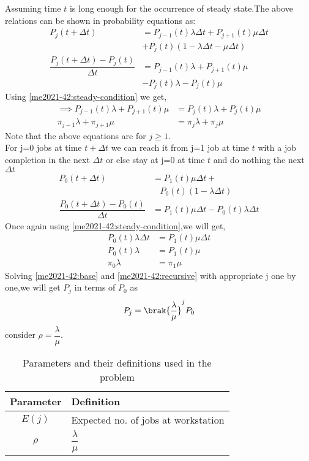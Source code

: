  Assuming time  $t$ is long enough for the occurrence of steady state.The above relations can be shown in probability equations as:  
 \begin{align}
     P_j(t+\Delta t)&=P_{j-1}(t)\lambda\Delta t+ P_{j+1}(t)\mu \Delta t \nonumber\\&+P_j (t) (1-\lambda\Delta t -\mu \Delta t)\\
     \dfrac{P_j(t+\Delta t)-P_j (t)}{\Delta t}&= P_{j-1}(t)\lambda +P_{j+1}(t)\mu\nonumber\\& - P_j(t)\lambda -P_j(t)\mu
\end{align}
Using \eqref{me2021-42:steady-condition} we get,
\begin{align}
     \implies P_{j-1}(t)\lambda +P_{j+1}(t)\mu&=P_j(t)\lambda +P_j(t)\mu \\
     \pi_{j-1}\lambda +\pi_{j+1}\mu&=\pi_j\lambda +\pi_j\mu\label{me2021-42:recursive} 
 \end{align}
 Note that the above equations are  for $j \geq 1$. \\
 For j=0 jobs at time $t+\Delta t$ we can reach it from j=1 job at time $t$ with a job completion in the next $\Delta t$ or else stay at j=0 at time $t$ and do nothing the next $\Delta t$
\begin{align}
    P_0(t+\Delta t)&=P_1(t)\mu \Delta t+\nonumber\\&~~~~P_0(t)(1-\lambda \Delta t)\\
    \dfrac{P_0(t+\Delta t)-P_0(t)}{\Delta t}&=P_1(t) \mu \Delta t-P_0(t)\lambda \Delta t
\end{align}
Once again using \eqref{me2021-42:steady-condition},we will get,
\begin{align}
    P_0(t)\lambda \Delta t&= P_1(t) \mu \Delta t\\
    P_0(t)\lambda&=P_1(t) \mu \\
    \pi_0 \lambda&=\pi_1\mu\label{me2021-42:base}
\end{align}
Solving \eqref{me2021-42:base} and \eqref{me2021-42:recursive} with appropriate j one by one,we will get $P_j$ in terms of $P_0$ as
\begin{equation}
    P_j=\brak{\dfrac{\lambda}{\mu}}^jP_0 
\end{equation}
consider $\rho = \dfrac{\lambda}{\mu}$.
\begin{table}[h]
\begin{tabular}{|c|p{6cm}|}
\hline
\textbf{Parameter} & \textbf{Definition}                               \\ \hline
$E(j)$             & Expected no. of jobs at workstation \\ \hline
$\rho$             & $\dfrac{\lambda}{\mu}$\\\hline
\end{tabular}
\caption{Parameters and their definitions used in the problem}
\label{me2021-42:tab:parameters}
\end{table}
